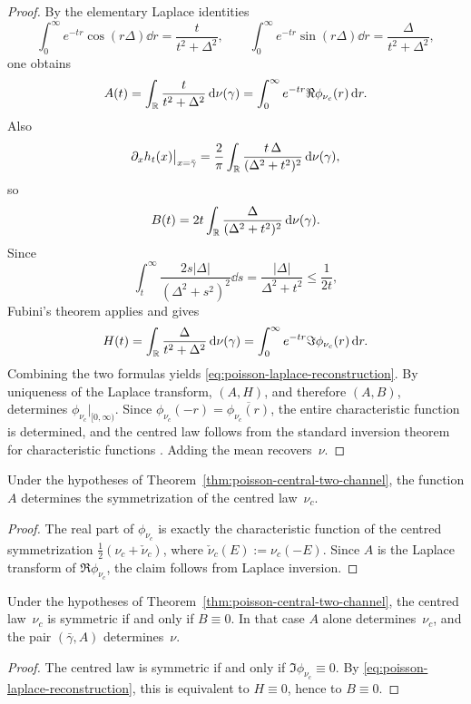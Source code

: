 \begin{proof}
By the elementary Laplace identities
\[
\int_0^\infty e^{-tr}\cos(r\Delta)\dd r=\frac{t}{t^2+\Delta^2},
\qquad
\int_0^\infty e^{-tr}\sin(r\Delta)\dd r=\frac{\Delta}{t^2+\Delta^2},
\]
one obtains
\[
A(t)
=\int_{\mathbb{R}}\frac{t}{t^2+\Delta^2}\,\mathrm{d}\nu(\gamma)
=\int_0^\infty e^{-tr}\Re\phi_{\nu_c}(r)\,\mathrm{d} r.
\]
Also
\[
\partial_x h_t(x)\big|_{x=\bar\gamma}
=\frac{2}{\pi}\int_{\mathbb{R}}\frac{t\,\Delta}{(\Delta^2+t^2)^2}\,\mathrm{d}\nu(\gamma),
\]
so
\[
B(t)=2t\int_{\mathbb{R}}\frac{\Delta}{(\Delta^2+t^2)^2}\,\mathrm{d}\nu(\gamma).
\]
Since
\[
\int_t^\infty \frac{2s|\Delta|}{(\Delta^2+s^2)^2}\dd s
=\frac{|\Delta|}{\Delta^2+t^2}
\le \frac{1}{2t},
\]
Fubini's theorem applies and gives
\[
H(t)
=\int_{\mathbb{R}}\frac{\Delta}{t^2+\Delta^2}\,\mathrm{d}\nu(\gamma)
=\int_0^\infty e^{-tr}\Im\phi_{\nu_c}(r)\,\mathrm{d} r.
\]
Combining the two formulas yields
\eqref{eq:poisson-laplace-reconstruction}.  By uniqueness of the Laplace
transform, $(A,H)$, and therefore $(A,B)$, determines
$\phi_{\nu_c}|_{[0,\infty)}$.  Since
$\phi_{\nu_c}(-r)=\overline{\phi_{\nu_c}(r)}$, the entire characteristic
function is determined, and the centred law follows from the standard
inversion theorem for characteristic functions
\cite[Chapter~XV]{Feller1971}.  Adding the mean recovers~$\nu$.
\end{proof}

\begin{corollary}%
\label{cor:poisson-symmetrization}
Under the hypotheses of Theorem~\ref{thm:poisson-central-two-channel}, the
function $A$ determines the symmetrization of the centred law~$\nu_c$.
\end{corollary}

\begin{proof}
The real part of $\phi_{\nu_c}$ is exactly the characteristic function of
the centred symmetrization
$\frac12(\nu_c+\check\nu_c)$, where $\check\nu_c(E):=\nu_c(-E)$.  Since
$A$ is the Laplace transform of $\Re\phi_{\nu_c}$, the claim follows from
Laplace inversion.
\end{proof}

\begin{corollary}%
\label{cor:poisson-symmetric-case}
Under the hypotheses of Theorem~\ref{thm:poisson-central-two-channel}, the
centred law~$\nu_c$ is symmetric if and only if $B\equiv 0$.  In that
case $A$ alone determines~$\nu_c$, and the pair $(\bar\gamma,A)$
determines~$\nu$.
\end{corollary}

\begin{proof}
The centred law is symmetric if and only if
$\Im\phi_{\nu_c}\equiv 0$.  By
\eqref{eq:poisson-laplace-reconstruction}, this is equivalent to
$H\equiv 0$, hence to $B\equiv 0$.
\end{proof}

